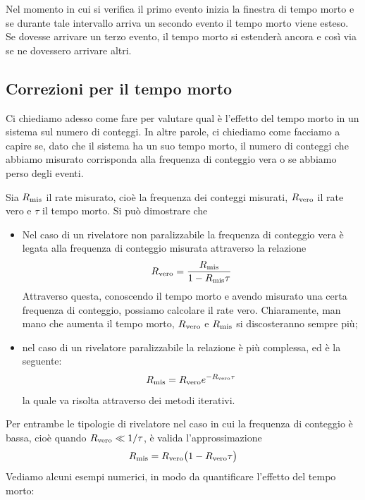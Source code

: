 Nel momento in cui si verifica il primo evento inizia la finestra di tempo morto e se durante tale intervallo arriva un secondo evento il tempo morto viene esteso. Se dovesse arrivare un terzo evento, il tempo morto si estenderà ancora e così via se ne dovessero arrivare altri. 

\subsection{Correzioni per il tempo morto}

Ci chiediamo adesso come fare per valutare qual è l'effetto del tempo morto in un sistema sul numero di conteggi. In altre parole, ci chiediamo come facciamo a capire se, dato che il sistema ha un suo tempo morto, il numero di conteggi che abbiamo misurato corrisponda alla frequenza di conteggio vera o se abbiamo perso degli eventi.

Sia $R_{\rm mis}$ il rate misurato, cioè la frequenza dei conteggi misurati, $R_{\rm vero}$ il rate vero e $\tau$ il tempo morto. Si può dimostrare che
\begin{itemize}[leftmargin=0.5cm]
   \item Nel caso di un rivelatore non paralizzabile la frequenza di conteggio vera è legata alla frequenza di conteggio misurata attraverso la relazione
   \begin{equation*}
      R_{\rm vero}=\frac{R_{\rm mis}}{1 - R_{\rm mis} \tau}
   \end{equation*}
   Attraverso questa, conoscendo il tempo morto e avendo misurato una certa frequenza di conteggio, possiamo calcolare il rate vero. Chiaramente, man mano che aumenta il tempo morto, $R_{\rm vero}$ e $R_{\rm mis}$ si discosteranno sempre più;
   \item nel caso di un rivelatore paralizzabile la relazione è più complessa, ed è la seguente:
   \begin{equation*}
      R_{\rm mis}=R_{\rm vero}e^{-R_{\rm vero} \tau}
   \end{equation*}
   la quale va risolta attraverso dei metodi iterativi.
\end{itemize}
Per entrambe le tipologie di rivelatore nel caso in cui la frequenza di conteggio è bassa, cioè quando $R_{\rm vero} \ll 1/\tau$, è valida l'approssimazione
\begin{equation*}
   R_{\rm mis}=R_{\rm vero}\bigl( 1 - R_{\rm vero} \tau \bigr)
\end{equation*}
Vediamo alcuni esempi numerici, in modo da quantificare l'effetto del tempo morto:

